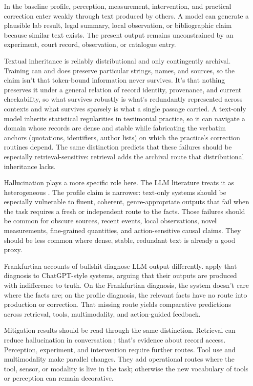 \documentclass[12pt]{article}
\begin{document}
In the baseline profile, perception, measurement, intervention, and practical correction
enter weakly through text produced by others. A model can generate a
plausible lab result, legal summary, local observation, or bibliographic claim because
similar text exists. The present output remains unconstrained by an experiment, court
record, observation, or catalogue entry.

Textual inheritance is reliably distributional and only contingently archival. Training
can and does preserve particular strings, names, and sources, so the claim isn't that
token-bound information never survives. It's that nothing preserves it under a general
relation of record identity, provenance, and current checkability, so what survives
robustly is what's redundantly represented across contexts and what survives sparsely is
what a single passage carried. A text-only model inherits statistical regularities in
testimonial practice, so it can navigate a domain whose records are dense and stable while
fabricating the verbatim anchors (quotations, identifiers, author lists) on which the
practice's correction routines depend. The same distinction predicts that these failures should be especially
retrieval-sensitive: retrieval adds the archival route that distributional inheritance
lacks.

Hallucination plays a more specific role here. The LLM literature treats it as heterogeneous
\citep{huang_etal_2025_survey_hallucination_llms}. The profile claim is narrower:
text-only systems should be especially vulnerable to fluent, coherent, genre-appropriate
outputs that fail when the task requires a fresh or independent route to the facts.
Those failures should be common for obscure sources, recent events, local observations,
novel measurements, fine-grained quantities, and action-sensitive causal claims. They
should be less common where dense, stable, redundant text is already a good proxy.

Frankfurtian accounts of bullshit \citep{frankfurt_1986_on_bullshit} diagnose LLM output
differently. \textcite{hicks_humphries_slater_2024_chatgpt_bullshit} apply that diagnosis
to ChatGPT-style systems, arguing that their outputs are produced with indifference to
truth. On the Frankfurtian diagnosis, the system doesn't care where the facts are; on the
profile diagnosis, the relevant facts have no route into production or correction. That
missing route yields comparative predictions across retrieval, tools, multimodality, and
action-guided feedback.

Mitigation results should be read through the same distinction. Retrieval can reduce
hallucination in conversation \citep{shuster2021retrieval}; that's evidence about record
access. Perception, experiment, and intervention require further routes. Tool use and
multimodality make parallel changes. They add operational routes where the tool, sensor,
or modality is live in the task; otherwise the new vocabulary of tools or
perception can remain decorative.
\end{document}
